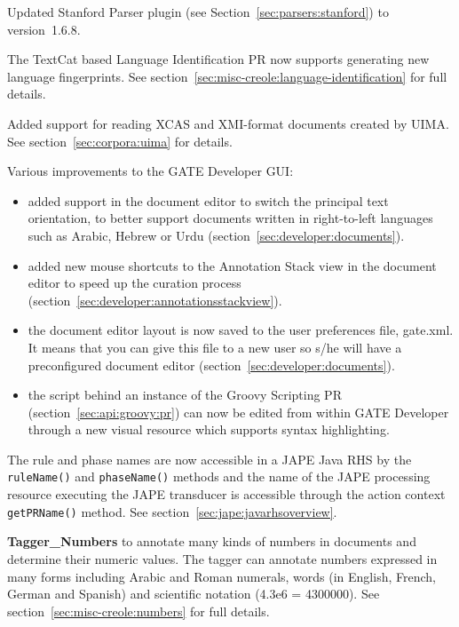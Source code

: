 Updated Stanford Parser plugin (see Section~\ref{sec:parsers:stanford}) to
version~1.6.8.

The TextCat based Language Identification PR now supports generating new
language fingerprints.  See
section~\ref{sec:misc-creole:language-identification} for full details.

Added support for reading XCAS and XMI-format documents created by UIMA. See
section~\ref{sec:corpora:uima} for details.

Various improvements to the GATE Developer GUI:
\begin{itemize}
\item added support in the document editor to switch the principal text
  orientation, to better support documents written in right-to-left languages
  such as Arabic, Hebrew or Urdu (section~\ref{sec:developer:documents}).
\item added new mouse shortcuts to the Annotation Stack view in the document
  editor to speed up the curation process
  (section~\ref{sec:developer:annotationsstackview}).
\item the document editor layout is now saved to the user preferences file,
  gate.xml. It means that you can give this file to a new user so s/he will
  have a preconfigured document editor
  (section~\ref{sec:developer:documents}).
\item the script behind an instance of the Groovy Scripting PR
  (section~\ref{sec:api:groovy:pr}) can now be edited from within GATE
  Developer through a new visual resource which supports syntax highlighting.
\end{itemize}

The rule and phase names are now accessible in a JAPE Java RHS by the 
\verb=ruleName()= and \verb=phaseName()= methods and the name of the 
JAPE processing resource executing the JAPE transducer is accessible
through the action context \verb=getPRName()= method. 
See section~\ref{sec:jape:javarhsoverview}.




\textbf{Tagger\_Numbers} to annotate many kinds of numbers in documents and
determine their numeric values.  The tagger can annotate numbers expressed in
many forms including Arabic and Roman numerals, words (in English, French,
German and Spanish) and scientific notation (4.3e6 = 4300000).  See
section~\ref{sec:misc-creole:numbers} for full details.


